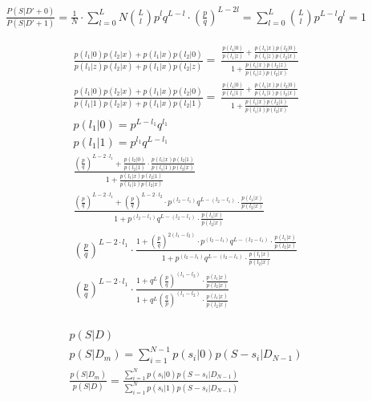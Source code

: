 \documentclass[11pt,draft]{article}
\begin{document}
\begin{align}
\frac{P(S|D'+0)}{P(S|D'+1)} = \frac{1}{N}   \cdot  \sum_{l=0}^{L} N \binom{L}{l} p^lq^{L-l} \cdot  \left ( \frac{p}{q} \right )^ {L - 2l} =  \sum_{l=0}^{L} \binom{L}{l} p^{L-l}q^{l} = 1
\end{align}


\begin{align}
\frac{p(l_1|0)p(l_2|x) + p(l_1|x)p(l_2|0)}{p(l_1|z)p(l_2|x) + p(l_1|x)p(l_2|z)} = \
\frac{ \frac{p(l_1|0)}{p(l_1|z)} + \frac{p(l_1|x)p(l_2|0)}{p(l_1|z)p(l_2|x)}}{1 + \frac{p(l_1|x)p(l_2|z)}{p(l_1|z)p(l_2|x)}} \\
\frac{p(l_1|0)p(l_2|x) + p(l_1|x)p(l_2|0)}{p(l_1|1)p(l_2|x) + p(l_1|x)p(l_2|1)} = \
\frac{ \frac{p(l_1|0)}{p(l_1|1)} + \frac{p(l_1|x)p(l_2|0)}{p(l_1|1)p(l_2|x)}}{1 + \frac{p(l_1|x)p(l_2|1)}{p(l_1|1)p(l_2|x)}} \\
p(l_1|0) = p^{L-l_1}q^{l_1}\\
p(l_1|1) = p^{l_1}q^{L-l_1}\\
\frac{ \left ( \frac{p}{q} \right )^{L-2\cdot l_1}  +  \frac{p(l_2|0)}{p(l_2|1)} \cdot \frac{p(l_1|x)p(l_2|1)}{p(l_1|1)p(l_2|x)}  } { 1 + \frac{p(l_1|x)p(l_2|1)}{p(l_1|1)p(l_2|x)}} \\
\frac{ \left ( \frac{p}{q} \right )^{L-2\cdot l_1}  +   \left ( \frac{p}{q} \right )^{L-2\cdot l_2} \cdot p^{(l_2-l_1)}q^{L-(l_2-l_1)} \cdot\frac{p(l_1|x)}{p(l_2|x)}  } { 1 +  p^{(l_2-l_1)}q^{L-(l_2-l_1)} \cdot\frac{p(l_1|x)}{p(l_2|x)} } \\
\left ( \frac{p}{q} \right )^{L-2\cdot l_1} \cdot \frac{ 1 +   \left ( \frac{p}{q} \right )^{2(l_1-l_2)} \cdot p^{(l_2-l_1)}q^{L-(l_2-l_1)} \cdot\frac{p(l_1|x)}{p(l_2|x)}  } { 1 +  p^{(l_2-l_1)}q^{L-(l_2-l_1)} \cdot\frac{p(l_1|x)}{p(l_2|x)} } \\
\left ( \frac{p}{q} \right )^{L-2\cdot l_1} \cdot \frac{ 1 +   q^L \left ( \frac{p}{q} \right )^{(l_1-l_2)} \cdot\frac{p(l_1|x)}{p(l_2|x)}  } { 1 +  q^L  \left ( \frac{q}{p} \right )^{(l_1-l_2)}  \cdot\frac{p(l_1|x)}{p(l_2|x)} } \\
\end{align}

\begin{align}
p(S|D) \\
p(S|D_m) = \sum_{i=1}^{N-1}  p(s_i |0) p(S-s_i | D_{N-1}) \\
\frac{p(S|D_m)}{p(S|D)} = \frac{ \sum_{i=1}^{N}  p(s_i |0) p(S-s_i | D_{N-1})}{ \sum_{i=1}^{N}  p(s_i |1) p(S-s_i | D_{N-1})}
\end{align}
\end{document}

